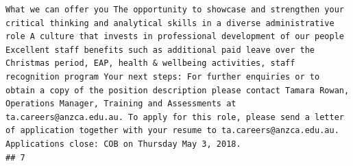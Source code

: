 \documentclass[11pt,a4paper,]{article}
\begin{document}
\begin{verbatim}
What we can offer you The opportunity to showcase and strengthen your critical thinking and analytical skills in a diverse administrative role A culture that invests in professional development of our people Excellent staff benefits such as additional paid leave over the Christmas period, EAP, health & wellbeing activities, staff recognition program Your next steps: For further enquiries or to obtain a copy of the position description please contact Tamara Rowan, Operations Manager, Training and Assessments at ta.careers@anzca.edu.au. To apply for this role, please send a letter of application together with your resume to ta.careers@anzca.edu.au.   Applications close: COB on Thursday May 3, 2018.
## 7                                                                                                                                                                                                                                                                                                                                                                                                                                                                                                                                                                                                                                                                                                                                                                                                                                                                                                                                                                                                                                                                                                                                                                                                                                                                                                                                                                                                                                                                                                                                                                                                                                                                                                                                                                                                                                                                                                                                                                                                                                                                                                                                                                                                                                                                                                                                                                                                                                                                                                                                                                                                                                                                                                                 
\end{verbatim}
\end{document}
